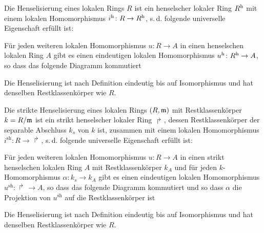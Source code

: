 \documentclass[german]{scrreprt}
\begin{document}
\begin{Definition}[Henselisierung]\label{def:henselisierung}
  Die Henselisierung eines lokalen Rings $R$ ist ein henselscher
  lokaler Ring $R^{\text{h}}$ mit einem lokalen Homomorphismus
  $i^\text{h}\colon R\to R^{\text{h}}$, s.\,d. folgende universelle Eigenschaft
  erfüllt ist:
  
  Für jeden weiteren lokalen Homomorphismus $u\colon R\to A$ in einen
  henselschen lokalen Ring $A$ gibt es einen eindeutigen lokalen
  Homomorphismus $u^\text{h}\colon R^{\text{h}}\to A$, so dass das folgende Diagramm
  kommutiert
  \begin{center}
  \end{center}
  \cite[2.3, Definition 6]{neron}

  Die Henselisierung ist nach Definition eindeutig bis auf
  Isomorphismus und hat denselben Restklassenkörper wie $R$.
  \cite[Chapter 2.3, S. 47]{neron}
\end{Definition}

\begin{Definition}\label{def:striktehenselisierung}
  Die strikte Henselisierung eines lokalen Rings $(R,\mathfrak{m})$ mit
  Restklassenkörper $k=R/\mathfrak{m}$ ist ein strikt henselscher lokaler Ring
  $\Rsh$, dessen Restklassenkörper der separable Abschluss $k_s$ von
  $k$ ist, zusammen mit einem lokalen Homomorphismus
  $i^\text{sh}\colon R\to\Rsh$, s.\,d. folgende universelle
  Eigenschaft erfüllt ist:
  
  Für jeden weiteren lokalen Homomorphismus $u\colon R\to A$ in einen
  strikt henselschen lokalen Ring $A$ mit Restklassenkörper $k_A$ und
  für jeden $k$-Homomorphismus $\alpha\colon k_s\to k_A$ gibt es einen
  eindeutigen lokalen Homomorphismus $u^\text{sh}\colon\Rsh\to A$, so
  dass das folgende Diagramm kommutiert und so dass $\alpha$ die
  Projektion von $u^\text{sh}$ auf die Restklassenkörper ist
  \begin{center}
  \end{center}

  Die Henselisierung ist nach Definition eindeutig bis auf
  Isomorphismus und hat denselben Restklassenkörper wie $R$.
\end{Definition}
\end{document}
